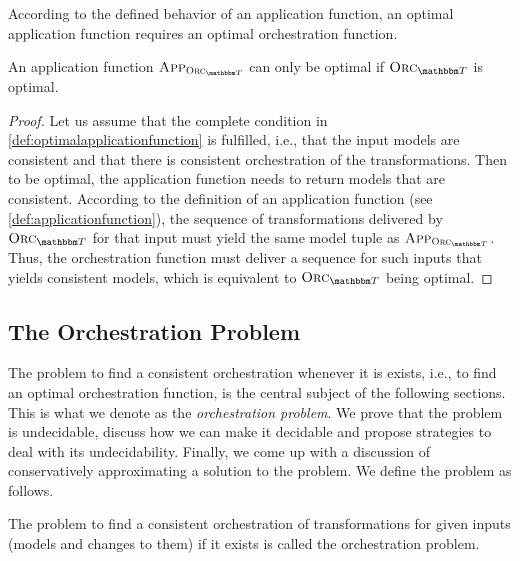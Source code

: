 According to the defined behavior of an application function, an optimal application function requires an optimal orchestration function.

\begin{lemma}
    \label{lemma:optimalapplicationfunction}
    An application function $\appfunction{\orcfunction{\transformationset{T}}}$ can only be optimal if $\orcfunction{\transformationset{T}}$ is optimal.
\end{lemma}
\begin{proof}
    Let us assume that the complete condition in \autoref{def:optimalapplicationfunction} is fulfilled, i.e., that the input models are consistent and that there is consistent orchestration of the transformations.
    Then to be optimal, the application function needs to return models that are consistent.
    According to the definition of an application function (see \autoref{def:applicationfunction}), the sequence of transformations delivered by $\orcfunction{\transformationset{T}}$ for that input must yield the same model tuple as $\appfunction{\orcfunction{\transformationset{T}}}$.
    Thus, the orchestration function must deliver a sequence for such inputs that yields consistent models, which is equivalent to $\orcfunction{\transformationset{T}}$ being optimal.
\end{proof}


\subsection{The Orchestration Problem}

The problem to find a consistent orchestration whenever it is exists, i.e., to find an optimal orchestration function, is the central subject of the following sections.
This is what we denote as the \emph{orchestration problem}.
We prove that the problem is undecidable, discuss how we can make it decidable and propose strategies to deal with its undecidability.
Finally, we come up with a discussion of conservatively approximating a solution to the problem.
We define the problem as follows.
\begin{definition}
    \label{def:orchestrationproblem}
    The problem to find a consistent orchestration of transformations for given inputs (models and changes to them) if it exists is called the orchestration problem.
\end{definition}

